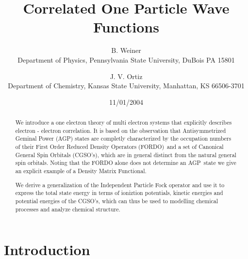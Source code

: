\documentclass[titlepage]{article}%
\begin{document}
\title{Correlated One Particle Wave Functions}
\author{B. Weiner\\Department of Physics, Pennsylvania State University, DuBois PA 15801
\and J. V. Ortiz\\Department of Chemistry, Kansas State
University, Manhattan, KS 66506-3701}

\begin{abstract}
We introduce a one electron theory of multi electron systems that explicitly
describes electron - electron correlation. It is based on the observation that
Antisymmetrized Geminal Power (AGP) states are completly characterized by the
occupation numbers of their First Order Reduced Density Operators (FORDO)\ and
a set of Canonical General Spin Orbitals (CGSO's), which are in general
distinct from the natural general spin orbitals. Noting that the FORDO alone
does not determine an AGP\ state we give an explicit example of a Density
Matrix Functional.

We derive a generalization of the Independent Particle Fock operator and use
it to express the total state energy in terms of ioniztion potentials, kinetic
energies and potential energies of the CGSO's, which can thus be used to
modelling chemical processes and analyze chemical structure.

\end{abstract}
\date{11/01/2004}
\maketitle
\tableofcontents

\section{Introduction \label{intro}}
\end{document}
